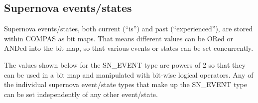 \newpage 
\subsection{Supernova events/states}\label{sec:SNEvents}

Supernova events/states, both current (``is'') and past (``experienced''), are stored within COMPAS as bit maps.  That means different values can be ORed or ANDed into the bit map, so that various events or states can be set concurrently.  

The values shown below for the SN\_EVENT type are powers of 2 so that they can be used in a bit map and manipulated with bit-wise logical operators.  Any of the individual supernova event/state types that make up the SN\_EVENT type can be set independently of any other event/state.

